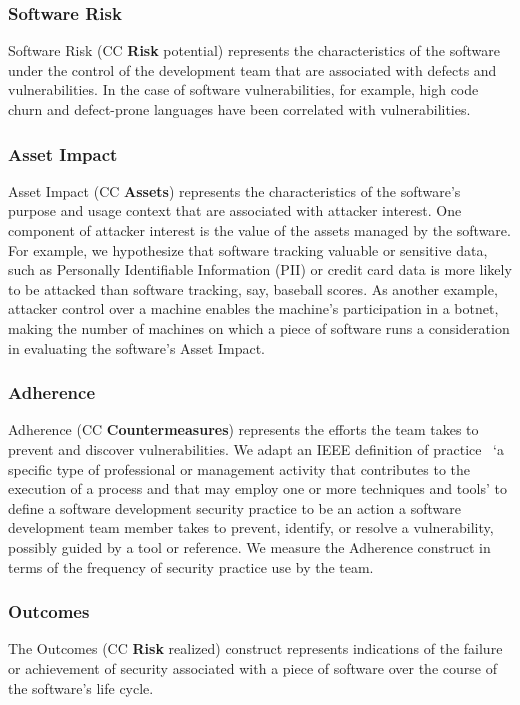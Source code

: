 \subsubsection{Software Risk}
Software Risk (CC \textbf{Risk} potential) represents the characteristics of the software under the control of the development team that are associated with defects and vulnerabilities. In the case of software vulnerabilities, for example, high code churn and defect-prone languages have been correlated with vulnerabilities.

\subsubsection{Asset Impact}
Asset Impact (CC \textbf{Assets}) represents the characteristics of the software's purpose and usage context that are associated with attacker interest. One component of attacker interest is the value of the assets managed by the software. For example, we hypothesize that software tracking valuable or sensitive data, such as Personally Identifiable Information (PII) or credit card data is more likely to be attacked than software tracking, say, baseball scores. As another example, attacker control over a machine enables the machine's participation in a botnet, making the number of machines on which a piece of software runs a consideration in evaluating the software's Asset Impact.

\subsubsection{Adherence}
\label{sec:model_contruct_adherence}
Adherence (CC \textbf{Countermeasures}) represents the efforts the team takes to prevent and discover vulnerabilities. We adapt an IEEE definition of practice~\cite{ieee1990glossary} `a specific type of professional or management activity that contributes to 
the execution of a process and that may employ one or more techniques and tools' to define a software development security practice to be an action a software development team member takes to prevent, identify, or resolve a vulnerability, possibly guided by a tool or reference. We measure the Adherence construct in terms of the frequency  of security practice use by the team.  

\subsubsection{Outcomes}
\label{sec:model_contruct_outcome}
The Outcomes (CC \textbf{Risk} realized) construct represents indications of the failure or achievement of security associated with a piece of software over the course of the software's life cycle.

